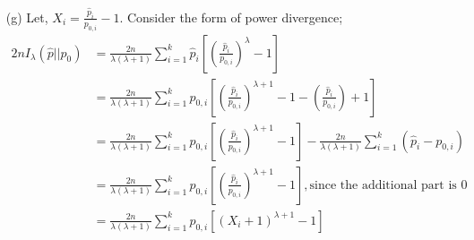 \documentclass[12pt]{article}
\begin{document}
\begin{enumerate}
\begin{solution}
\begin{enumerate}
	\item[(g)] Let, $X_i = \frac{\hat{p}_i}{p_{0,i}} - 1$. Consider the form of power divergence;
	\begin{align*}
		2nI_{\lambda}\left(\hat{p} || p_0\right) & = \frac{2n}{\lambda(\lambda+1)}\sum_{i=1}^{k}\hat{p}_i \left[\left(\frac{\hat{p}_i}{p_{0,i}}\right)^{\lambda} - 1\right]\\
		& = \frac{2n}{\lambda(\lambda+1)}\sum_{i=1}^{k}p_{0,i} \left[\left(\frac{\hat{p}_i}{p_{0,i}}\right)^{\lambda+1} - 1  -\left(\frac{\hat{p}_i}{p_{0,i}}\right) + 1\right]\\
		& = \frac{2n}{\lambda(\lambda+1)}\sum_{i=1}^{k}p_{0,i} \left[\left(\frac{\hat{p}_i}{p_{0,i}}\right)^{\lambda+1} - 1\right] - \frac{2n}{\lambda(\lambda+1)}\sum_{i=1}^{k}\left(\hat{p}_i - p_{0,i}\right)\\
		& = \frac{2n}{\lambda(\lambda+1)}\sum_{i=1}^{k}p_{0,i} \left[\left(\frac{\hat{p}_i}{p_{0,i}}\right)^{\lambda+1} - 1\right], \text{since the additional part is 0}\\
		& = \frac{2n}{\lambda(\lambda+1)}\sum_{i=1}^{k}p_{0,i} \left[\left(X_i + 1\right)^{\lambda+1} - 1\right]
	\end{align*}
	

\end{enumerate}
\end{solution}
\end{enumerate}
\end{document}
